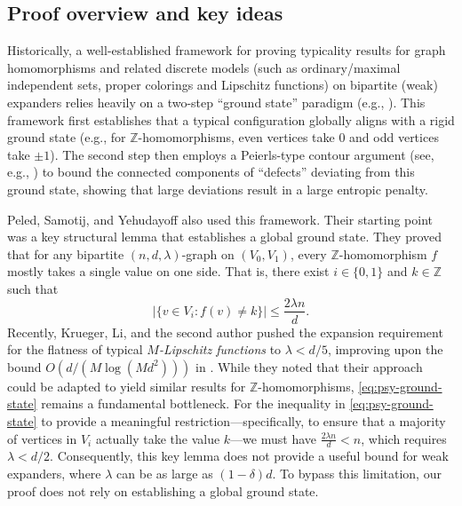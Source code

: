 \documentclass{amsart}
\theoremstyle{definition}
\newcommand{\0}[0]{\emptyset}
\begin{document}
\subsection{Proof overview and key ideas}

Historically, a well-established framework for proving typicality results for graph homomorphisms and related discrete models (such as ordinary/maximal independent sets, proper colorings and Lipschitz functions) on bipartite (weak) expanders relies heavily on a two-step ``ground state'' paradigm (e.g., \cite{balogh2025maximal,balogh2021independent,galvin2003homomorphisms, jenssen2023homomorphisms,JMP1,jenssen2020independent,   kahn2020number, kahn2022number,    krueger2024lipschitz,   li2023number,peled2013lipschitz,sapoposet,sapo}). This framework first establishes that a typical configuration globally aligns with a rigid ground state (e.g., for $\mathbb{Z}$-homomorphisms, even vertices take $0$ and odd vertices take $\pm 1$). The second step then employs a Peierls-type contour argument (see, e.g., \cite{peierls1936ising, korshunov1983number}) to bound the connected components of ``defects'' deviating from this ground state, showing that large deviations result in a large entropic penalty.

Peled, Samotij, and Yehudayoff \cite{peled2013lipschitz} also used this framework. Their starting point was a key structural lemma that establishes a global ground state. They proved that for any bipartite $(n,d,\lambda)$-graph on $(V_0, V_1)$, every $\mathbb{Z}$-homomorphism $f$ mostly takes a single value on one side. That is, there exist $i \in \{0,1\}$ and $k \in \mathbb{Z}$ such that
\begin{equation}\label{eq:psy-ground-state}
    |\{v \in V_i: f(v) \ne k\}| \le \frac{2\lambda n}{d}.
\end{equation}
Recently, Krueger, Li, and the second author \cite{krueger2024lipschitz} pushed the expansion requirement for the flatness of typical \textit{$M$-Lipschitz functions} to $\lambda < d/5$, improving upon the bound $O(d/(M\log(Md^2)))$ in \cite{peled2013lipschitz}. While they noted that their approach could be adapted to yield similar results for $\mathbb{Z}$-homomorphisms, \eqref{eq:psy-ground-state} remains a fundamental bottleneck. For the inequality in \eqref{eq:psy-ground-state} to provide a meaningful restriction---specifically, to ensure that a majority of vertices in $V_i$ actually take the value $k$---we must have $\frac{2\lambda n}{d} < n$, which requires $\lambda < d/2$. Consequently, this key lemma does not provide a useful bound for weak expanders, where $\lambda$ can be as large as $(1-\delta)d$. To bypass this limitation, our proof does not rely on establishing a global ground state.
\end{document}
